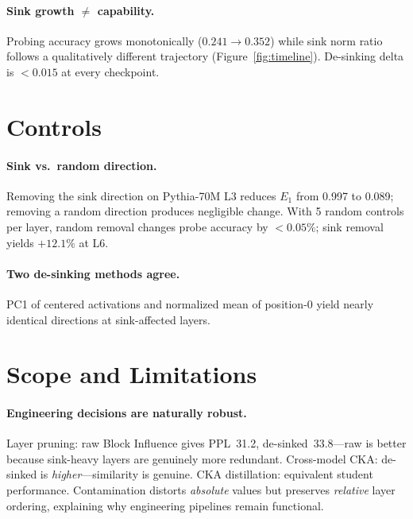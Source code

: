 \documentclass[11pt]{article}
\begin{document}
\paragraph{Sink growth $\neq$ capability.}
Probing accuracy grows monotonically ($0.241 \to 0.352$) while sink norm ratio follows a qualitatively different trajectory (Figure~\ref{fig:timeline}).
De-sinking delta is $< 0.015$ at every checkpoint.

\section{Controls}\label{sec:controls}

\paragraph{Sink vs.\ random direction.}
Removing the sink direction on Pythia-70M L3 reduces $E_1$ from 0.997 to 0.089; removing a random direction produces negligible change.
With 5 random controls per layer, random removal changes probe accuracy by $< 0.05\%$; sink removal yields $+12.1\%$ at L6.

\paragraph{Two de-sinking methods agree.}
PC1 of centered activations and normalized mean of position-0 yield nearly identical directions at sink-affected layers.

\section{Scope and Limitations}\label{sec:limits}

\paragraph{Engineering decisions are naturally robust.}
Layer pruning: raw Block Influence gives PPL~31.2, de-sinked~33.8---raw is better because sink-heavy layers are genuinely more redundant.
Cross-model CKA: de-sinked is \emph{higher}---similarity is genuine.
CKA distillation: equivalent student performance.
Contamination distorts \emph{absolute} values but preserves \emph{relative} layer ordering, explaining why engineering pipelines remain functional.
\end{document}
